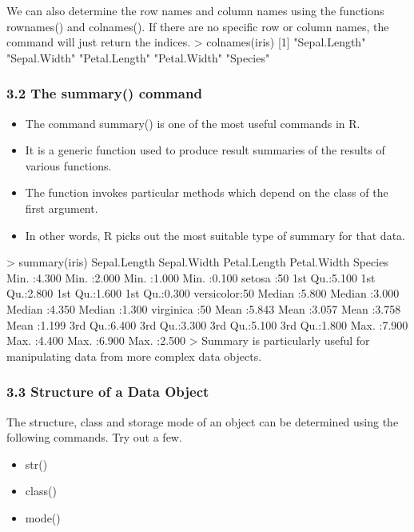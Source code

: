 \documentclass{beamer}
\begin{document}
\begin{frame}[fragile]
	We can also determine the row names and column names using the functions rownames()
	and colnames(). If there are no specific row or column names, the command will just return
	the indices.
	> colnames(iris)
	[1] "Sepal.Length" "Sepal.Width" "Petal.Length" "Petal.Width" "Species"
	
\end{frame}
\begin{frame}
	\frametitle{3.2 The summary() command}
	\begin{itemize}
		\item The command summary() is one of the most useful commands in R. 
		\item It is a generic function used
		to produce result summaries of the results of various functions. 
		\item The function invokes particular
		methods which depend on the class of the first argument. 
		\item In other words, R picks out the most
		suitable type of summary for that data.
	\end{itemize}
\end{frame}
\begin{frame}[fragile]
	> summary(iris)
	Sepal.Length Sepal.Width Petal.Length Petal.Width Species
	Min. :4.300 Min. :2.000 Min. :1.000 Min. :0.100 setosa :50
	1st Qu.:5.100 1st Qu.:2.800 1st Qu.:1.600 1st Qu.:0.300 versicolor:50
	Median :5.800 Median :3.000 Median :4.350 Median :1.300 virginica :50
	Mean :5.843 Mean :3.057 Mean :3.758 Mean :1.199
	3rd Qu.:6.400 3rd Qu.:3.300 3rd Qu.:5.100 3rd Qu.:1.800
	Max. :7.900 Max. :4.400 Max. :6.900 Max. :2.500
	>
	Summary is particularly useful for manipulating data from more complex data objects.
\end{frame}
\begin{frame}
	
	\frametitle{3.3 Structure of a Data Object}
	The structure, class and storage mode of an object can be determined using the following
	commands. Try out a few.
	\begin{itemize}
		\item  str()
		\item  class()
		\item  mode()
	\end{itemize}
	
	
\end{frame}
\end{document}

